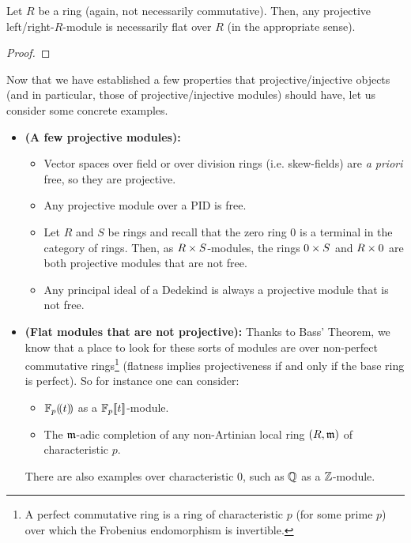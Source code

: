             \begin{corollary}
                Let $R$ be a ring (again, not necessarily commutative). Then, any projective left/right-$R$-module is necessarily flat over $R$ (in the appropriate sense). 
            \end{corollary}
                \begin{proof}
                    
                \end{proof}
            
            Now that we have established a few properties that projective/injective objects (and in particular, those of projective/injective modules) should have, let us consider some concrete examples. 
            \begin{example} \label{example: projetive_modules}
                \noindent
                \begin{itemize}
                    \item \textbf{(A few projective modules):} 
                        \begin{itemize}
                            \item Vector spaces over field or over division rings (i.e. skew-fields) are \textit{a priori} free, so they are projective.
                            \item Any projective module over a PID is free. 
                            \item Let $R$ and $S$ be rings and recall that the zero ring $0$ is a terminal in the category of rings. Then, as $R \x S$-modules, the rings $0 \x S$ and $R \x 0$ are both projective modules that are not free. 
                            \item Any principal ideal of a Dedekind is always a projective module that is not free. 
                        \end{itemize}
                    \item \textbf{(Flat modules that are not projective):} Thanks to Bass' Theorem, we know that a place to look for these sorts of modules are over non-perfect commutative rings\footnote{A perfect commutative ring is a ring of characteristic $p$ (for some prime $p$) over which the Frobenius endomorphism is invertible.} (flatness implies projectiveness if and only if the base ring is perfect). So for instance one can consider:
                        \begin{itemize}
                            \item $\mathbb{F}_p(\!(t)\!)$ as a $\mathbb{F}_p[\![t]\!]$-module.
                            \item The $\mathfrak{m}$-adic completion of any non-Artinian local ring $(R, \mathfrak{m})$ of characteristic $p$.
                        \end{itemize}
                    There are also examples over characteristic $0$, such as $\mathbb{Q}$ as a $\mathbb{Z}$-module.
                \end{itemize}
            \end{example}
